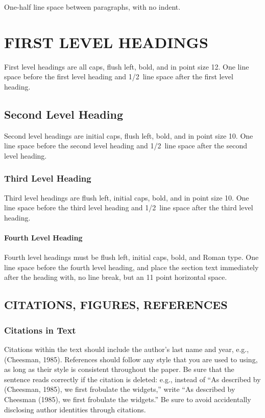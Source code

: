 \documentclass[twoside]{article}
\begin{document}
One-half line space between paragraphs, with no indent.

\section{FIRST LEVEL HEADINGS}

First level headings are all caps, flush left, bold, and in point size
12. One line space before the first level heading and 1/2~line space
after the first level heading.

\subsection{Second Level Heading}

Second level headings are initial caps, flush left, bold, and in point
size 10. One line space before the second level heading and 1/2~line
space after the second level heading.

\subsubsection{Third Level Heading}

Third level headings are flush left, initial caps, bold, and in point
size 10. One line space before the third level heading and 1/2~line
space after the third level heading.

\paragraph{Fourth Level Heading}

Fourth level headings must be flush left, initial caps, bold, and
Roman type.  One line space before the fourth level heading, and
place the section text immediately after the heading with, no line
break, but an 11 point horizontal space.

\subsection{CITATIONS, FIGURES, REFERENCES}


\subsubsection{Citations in Text}

Citations within the text should include the author's last name and
year, e.g., (Cheesman, 1985). References should follow any style that
you are used to using, as long as their style is consistent throughout
the paper.  Be sure that the sentence reads correctly if the citation
is deleted: e.g., instead of ``As described by (Cheesman, 1985), we
first frobulate the widgets,'' write ``As described by Cheesman
(1985), we first frobulate the widgets.''  Be sure to avoid
accidentally disclosing author identities through citations.
\end{document}
